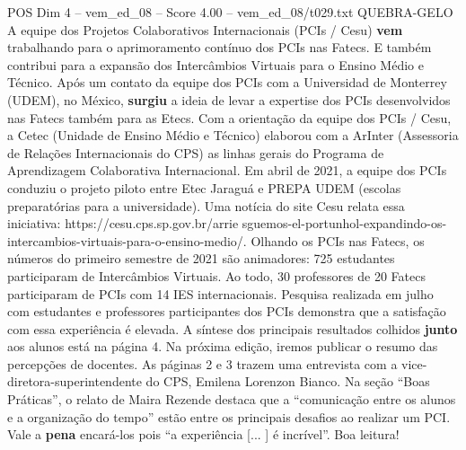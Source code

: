 \begin{textsample}{POS Dim 4 – vem\_ed\_08 – Score 4.00 – vem\_ed\_08/t029.txt}  \label{ex:f4_pos_131}
QUEBRA-GELO A equipe dos Projetos Colaborativos Internacionais (PCIs / Cesu) \textbf{vem} trabalhando para o aprimoramento contínuo dos PCIs nas Fatecs.
E também contribui para a expansão dos Intercâmbios Virtuais para o Ensino Médio e Técnico.
Após um contato da equipe dos PCIs com a Universidad de Monterrey (UDEM), no México, \textbf{surgiu} a ideia de levar a expertise dos PCIs desenvolvidos nas Fatecs também para as Etecs.
Com a orientação da equipe dos PCIs / Cesu, a Cetec (Unidade de Ensino Médio e Técnico) elaborou com a ArInter (Assessoria de Relações Internacionais do CPS) as linhas gerais do Programa de Aprendizagem Colaborativa Internacional.
Em abril de 2021, a equipe dos PCIs conduziu o projeto piloto entre Etec Jaraguá e PREPA UDEM (escolas preparatórias para a universidade).
Uma notícia do site Cesu relata essa iniciativa: https://cesu.cps.sp.gov.br/arrie sguemos-el-portunhol-expandindo-os-intercambios-virtuais-para-o-ensino-medio/.
Olhando os PCIs nas Fatecs, os números do primeiro semestre de 2021 são animadores: 725 estudantes participaram de Intercâmbios Virtuais.
Ao todo, 30 professores de 20 Fatecs participaram de PCIs com 14 IES internacionais.
Pesquisa realizada em julho com estudantes e professores participantes dos PCIs demonstra que a satisfação com essa experiência é elevada.
A síntese dos principais resultados colhidos \textbf{junto} aos alunos está na página 4.
Na próxima edição, iremos publicar o resumo das percepções de docentes.
As páginas 2 e 3 trazem uma entrevista com a vice-diretora-superintendente do CPS, Emilena Lorenzon Bianco.
Na seção “Boas Práticas”, o relato de Maira Rezende destaca que a “comunicação entre os alunos e a organização do tempo” estão entre os principais desafios ao realizar um PCI.
Vale a \textbf{pena} encará-los pois “a experiência [... ] é incrível”.
Boa leitura!

\end{textsample}
